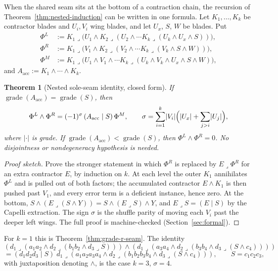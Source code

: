 \documentclass[11pt]{article}
\newtheorem{theorem}{Theorem}
\begin{document}
When the shared seam sits at the bottom of a contraction chain, the recursion
of Theorem~\ref{thm:nested-induction} can be written in one formula. Let
\(K_1,\ldots,K_k\) be contractor blades and \(U_i,V_i\) wing blades, and let
\(U_x\), \(S\), \(W\) be blades. Put
\[
\begin{aligned}
\Phi^L&:=K_1\mathbin{\lrcorner}\bigl(U_1\wedge K_2\mathbin{\lrcorner}
  (U_2\wedge\cdots K_k\mathbin{\lrcorner}(U_k\wedge U_x\wedge S))\bigr),\\
\Phi^R&:=K_1\mathbin{\lrcorner}\bigl(V_1\wedge K_2\mathbin{\lrcorner}
  (V_2\wedge\cdots K_k\mathbin{\lrcorner}(V_k\wedge S\wedge W))\bigr),\\
\Phi^M&:=K_1\mathbin{\lrcorner}\bigl(U_1\wedge V_1\wedge\cdots
  K_k\mathbin{\lrcorner}(U_k\wedge V_k\wedge U_x\wedge S\wedge W)\bigr),
\end{aligned}
\]
and \(A_{\mathrm{acc}}:=K_1\wedge\cdots\wedge K_k\).

\begin{theorem}[Nested sole-seam identity, closed form]
\label{thm:nested-closed}
If \(\operatorname{grade}(A_{\mathrm{acc}})=\operatorname{grade}(S)\), then
\[
\Phi^L\wedge\Phi^R
=(-1)^{\sigma}\,(A_{\mathrm{acc}}\mid S)\,\Phi^M,
\qquad
\sigma=\sum_{i=1}^{k}\lvert V_i\rvert
  \Bigl(\lvert U_x\rvert+\sum_{j>i}\lvert U_j\rvert\Bigr),
\]
where \(\lvert\cdot\rvert\) is grade. If
\(\operatorname{grade}(A_{\mathrm{acc}})<\operatorname{grade}(S)\), then
\(\Phi^L\wedge\Phi^R=0\). No disjointness or nondegeneracy hypothesis is
needed.
\end{theorem}

\begin{proof}[Proof sketch]
Prove the stronger statement in which \(\Phi^R\) is replaced by
\(E\mathbin{\lrcorner}\Phi^R\) for an extra contractor \(E\), by induction on
\(k\). At each level the outer \(K_1\) annihilates \(\Phi^L\) and is pulled
out of both factors; the accumulated contractor \(E\wedge K_1\) is then
pushed past \(V_1\), and every error term is a deficient instance, hence zero.
At the bottom, \(S\wedge(E\mathbin{\lrcorner}(S\wedge Y))
=S\wedge(E\mathbin{\lrcorner}S)\wedge Y\), and
\(E\mathbin{\lrcorner}S=(E\mid S)\) by the Capelli extraction. The sign
\(\sigma\) is the shuffle parity of moving each \(V_i\) past the deeper left
wings. The full proof is machine-checked (Section~\ref{sec:formal}).
\end{proof}

For \(k=1\) this is Theorem~\ref{thm:grade-r-seam}. The identity
\[
(d_1\mathbin{\lrcorner}(a_1 a_2\wedge d_2\mathbin{\lrcorner}
 (b_1 b_2\wedge d_3\mathbin{\lrcorner}S)))\wedge
(d_1\mathbin{\lrcorner}(a_3 a_4\wedge d_2\mathbin{\lrcorner}
 (b_3 b_4\wedge d_3\mathbin{\lrcorner}(S\wedge c_4))))
\]
\[
=(d_1 d_2 d_3\mid S)\;
 d_1\mathbin{\lrcorner}(a_1a_2a_3a_4\wedge d_2\mathbin{\lrcorner}
 (b_1b_2b_3b_4\wedge d_3\mathbin{\lrcorner}(S\wedge c_4))),
\qquad S=c_1c_2c_3,
\]
with juxtaposition denoting \(\wedge\), is the case \(k=3\), \(\sigma=4\).
\end{document}
